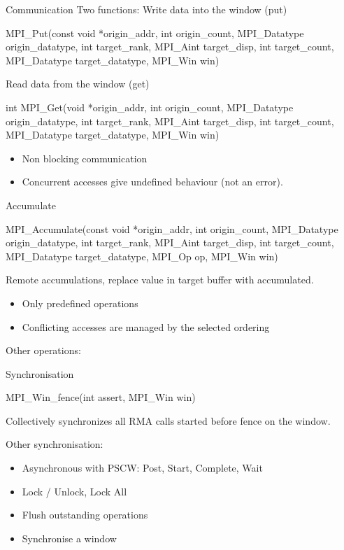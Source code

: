 \documentclass[aspectratio=43]{beamer}
\begin{document}
\begin{frame}[fragile]{Communication}
Two functions:
Write data into the window (put)
\begin{Cpplisting}[]{}
MPI_Put(const void *origin_addr, int origin_count, MPI_Datatype origin_datatype, int target_rank, MPI_Aint target_disp, int target_count, MPI_Datatype target_datatype, MPI_Win win)
\end{Cpplisting}

Read data from the window (get)
\begin{Cpplisting}[]{}
int MPI_Get(void *origin_addr, int origin_count, MPI_Datatype origin_datatype, int target_rank, MPI_Aint target_disp, int target_count, MPI_Datatype target_datatype, MPI_Win win)
\end{Cpplisting}

\begin{itemize}
\item Non blocking communication
\item Concurrent accesses give undefined behaviour (not an error).
\end{itemize}

\end{frame}


\begin{frame}[fragile]{Accumulate}
\begin{Cpplisting}[]{}
MPI_Accumulate(const void *origin_addr, int origin_count, MPI_Datatype origin_datatype, int target_rank, MPI_Aint target_disp, int target_count, MPI_Datatype target_datatype, MPI_Op op, MPI_Win win)
\end{Cpplisting}

Remote accumulations, replace value in target buffer with accumulated.

\begin{itemize}
\item Only predefined operations
\item Conflicting accesses are managed by the selected ordering
\end{itemize}

Other operations: 
\end{frame}

\begin{frame}[fragile]{Synchronisation}
\begin{Cpplisting}[]{}
MPI_Win_fence(int assert, MPI_Win win)
\end{Cpplisting}
Collectively synchronizes all RMA calls started before fence on the window.

Other synchronisation:
\begin{itemize}
\item Asynchronous with PSCW: Post, Start, Complete, Wait
\item Lock / Unlock, Lock All
\item Flush outstanding operations
\item Synchronise a window
\end{itemize}
\end{frame}

\end{document}
